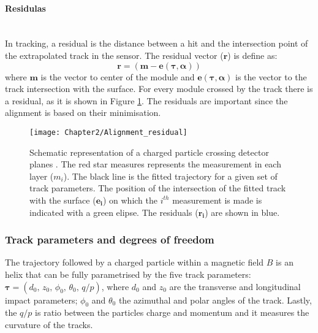 \paragraph{Residulas}\mbox{}\\
In tracking, a residual is the distance between a hit and the intersection point of 
the extrapolated track in the sensor. The residual vector ($\bm{r}$) is define as:
\begin{equation*}
	\bm{r} = (\bm{m} - \bm{e}(\bm{\tau}, \bm{\alpha}) )
\end{equation*}
where $\bm{m}$ is the vector to center of the module and $\bm{e}(\bm{\tau}, \bm{\alpha})$
is the vector to the track intersection with the surface.  For every module crossed by the track there is a residual,
as it is shown in Figure \ref{fig:Chap2:Alignment:Residual}. The residuals are important since 
the alignment is based on their minimisation.

\begin{figure}
\centering
\texttt{[image: Chapter2/Alignment\_residual]}
\caption{Schematic representation of a charged particle crossing detector planes \cite{ATLAS:2020ixw}.  
The red star measures represents the measurement in each layer ($m_i$). The black line is the 
fitted trajectory for a given set of track parameters. The position of the intersection of the fitted 
track with the surface ($\bm{e_{i}}$) on which the $i^{th}$ measurement is made is indicated with a
green elipse. The residuals ($\bm{r_{i}}$) are shown in blue.}
\label{fig:Chap2:Alignment:Residual}
\end{figure}


\subsubsection{Track parameters and degrees of freedom}
The trajectory followed by a charged particle within a magnetic field $B$ is an helix that 
can be fully parametrised by the five track parameters: 
$\bm{\tau} = (d_{0},\, z_{0},\, \phi_{0},\, \theta_{0},\, q/p)$, where $d_{0}$ and $z_{0}$  
are the transverse and longitudinal impact parameters; $\phi_{0}$ and $\theta_{0}$ the 
azimuthal and polar angles of the track.  Lastly, the $q/p$ is ratio between the particles
charge and momentum and it measures the curvature of the tracks. 


